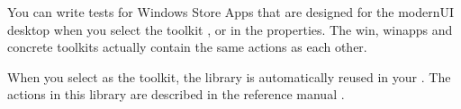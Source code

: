 You can write tests for Windows Store Apps \gdauts{} that are designed for the modernUI desktop when you select the toolkit ,  or  in the \gdproject{} properties. The win, winapps and concrete toolkits actually contain the same actions as each other. 

When you select  as the \gdproject{} toolkit, the library \gdproject{}  is automatically reused in your \gdproject{}. The actions in this library are described in the reference manual .
